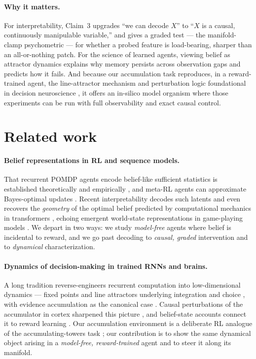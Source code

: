 \documentclass[11pt]{article}
\begin{document}
\paragraph{Why it matters.} For interpretability, Claim~3 upgrades ``we can decode
$X$'' to ``$X$ is a causal, continuously manipulable variable,'' and gives a
graded test --- the manifold-clamp psychometric --- for whether a probed feature is
load-bearing, sharper than an all-or-nothing patch. For the science of learned
agents, viewing belief as attractor dynamics explains why memory persists across
observation gaps and predicts how it fails. And because our accumulation task
reproduces, in a reward-trained agent, the line-attractor mechanism and
perturbation logic foundational in decision neuroscience \citep{mante2013context,
hanks2015distinct}, it offers an in-silico model organism where those experiments
can be run with full observability and exact causal control.

\section{Related work}

\paragraph{Belief representations in RL and sequence models.} That recurrent POMDP
agents encode belief-like sufficient statistics is established theoretically and
empirically \citep{kaelbling1998planning, lambrechts2022recurrent}, and meta-RL
agents can approximate Bayes-optimal updates \citep{mikulik2020meta}. Recent
interpretability decodes such latents and even recovers the \emph{geometry} of the
optimal belief predicted by computational mechanics in transformers
\citep{shai2024transformers}, echoing emergent world-state representations in
game-playing models \citep{li2023othello}. We depart in two ways: we study
\emph{model-free} agents where belief is incidental to reward, and we go past
decoding to \emph{causal, graded} intervention and to \emph{dynamical}
characterization.

\paragraph{Dynamics of decision-making in trained RNNs and brains.} A long
tradition reverse-engineers recurrent computation into low-dimensional dynamics
--- fixed points and line attractors underlying integration and choice
\citep{sussillo2013opening, mante2013context, wong2006recurrent}, with evidence
accumulation as the canonical case \citep{gold2007neural, brunton2013rats}. Causal
perturbations of the accumulator in cortex sharpened this picture
\citep{hanks2015distinct}, and belief-state accounts connect it to reward learning
\citep{starkweather2017dopamine}. Our accumulation environment is a deliberate RL
analogue of the accumulating-towers task \citep{pinto2018towers}; our contribution
is to show the same dynamical object arising in a \emph{model-free, reward-trained}
agent and to steer it along its manifold.
\end{document}
